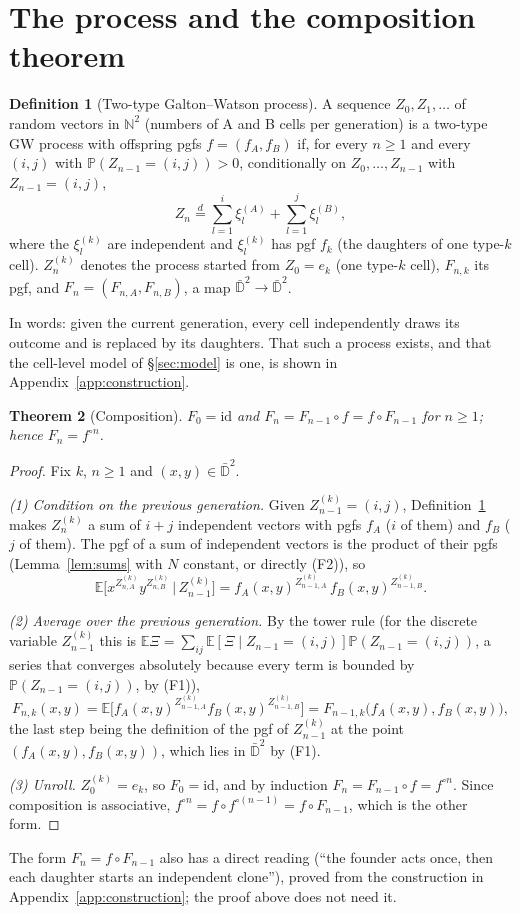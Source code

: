 \documentclass[11pt]{article}
\newtheorem{theorem}{Theorem}[section]
\theoremstyle{definition}
\newtheorem{definition}[theorem]{Definition}
\theoremstyle{remark}
\newcommand{\E}{\mathbb{E}}
\newcommand{\Prob}{\mathbb{P}}
\newcommand{\N}{\mathbb{N}}
\newcommand{\Dbar}{\bar{\mathbb D}^2}
\begin{document}
\section{The process and the composition theorem}\label{sec:composition}
\begin{definition}[Two-type Galton--Watson process]\label{def:gw}
A sequence $Z_0,Z_1,\dots$ of random vectors in $\N^2$ (numbers of A and B cells per generation) is a two-type GW process with offspring pgfs $f=(f_A,f_B)$ if, for every $n\ge1$ and every $(i,j)$ with $\Prob(Z_{n-1}=(i,j))>0$, conditionally on $Z_0,\dots,Z_{n-1}$ with $Z_{n-1}=(i,j)$,
\[
Z_n\overset{d}{=}\sum_{l=1}^{i}\xi^{(A)}_l+\sum_{l=1}^{j}\xi^{(B)}_l,
\]
where the $\xi^{(k)}_l$ are independent and $\xi^{(k)}_l$ has pgf $f_k$ (the daughters of one type-$k$ cell). $Z^{(k)}_n$ denotes the process started from $Z_0=e_k$ (one type-$k$ cell), $F_{n,k}$ its pgf, and $F_n=(F_{n,A},F_{n,B})$, a map $\Dbar\to\Dbar$.
\end{definition}
\noindent In words: given the current generation, every cell independently draws its outcome and is replaced by its daughters. That such a process exists, and that the cell-level model of \S\ref{sec:model} is one, is shown in Appendix~\ref{app:construction}.

\begin{theorem}[Composition]\label{thm:comp}
$F_0=\mathrm{id}$ and $F_n=F_{n-1}\circ f=f\circ F_{n-1}$ for $n\ge1$; hence $F_n=f^{\circ n}$.
\end{theorem}
\begin{proof}
Fix $k$, $n\ge1$ and $(x,y)\in\Dbar$.

\emph{(1) Condition on the previous generation.} Given $Z^{(k)}_{n-1}=(i,j)$, Definition~\ref{def:gw} makes $Z^{(k)}_n$ a sum of $i+j$ independent vectors with pgfs $f_A$ ($i$ of them) and $f_B$ ($j$ of them). The pgf of a sum of independent vectors is the product of their pgfs (Lemma~\ref{lem:sums} with $N$ constant, or directly (F2)), so
\[
\E\big[x^{Z^{(k)}_{n,A}}y^{Z^{(k)}_{n,B}}\,\big|\,Z^{(k)}_{n-1}\big]=f_A(x,y)^{Z^{(k)}_{n-1,A}}\,f_B(x,y)^{Z^{(k)}_{n-1,B}} .
\]

\emph{(2) Average over the previous generation.} By the tower rule (for the discrete variable $Z^{(k)}_{n-1}$ this is $\E\Xi=\sum_{ij}\E[\Xi\mid Z_{n-1}=(i,j)]\Prob(Z_{n-1}=(i,j))$, a series that converges absolutely because every term is bounded by $\Prob(Z_{n-1}=(i,j))$, by (F1)),
\[
F_{n,k}(x,y)=\E\Big[f_A(x,y)^{Z^{(k)}_{n-1,A}}f_B(x,y)^{Z^{(k)}_{n-1,B}}\Big]=F_{n-1,k}\big(f_A(x,y),f_B(x,y)\big),
\]
the last step being the definition of the pgf of $Z^{(k)}_{n-1}$ at the point $(f_A(x,y),f_B(x,y))$, which lies in $\Dbar$ by (F1).

\emph{(3) Unroll.} $Z^{(k)}_0=e_k$, so $F_0=\mathrm{id}$, and by induction $F_n=F_{n-1}\circ f=f^{\circ n}$. Since composition is associative, $f^{\circ n}=f\circ f^{\circ(n-1)}=f\circ F_{n-1}$, which is the other form.
\end{proof}
\noindent The form $F_n=f\circ F_{n-1}$ also has a direct reading (``the founder acts once, then each daughter starts an independent clone''), proved from the construction in Appendix~\ref{app:construction}; the proof above does not need it.
\end{document}

